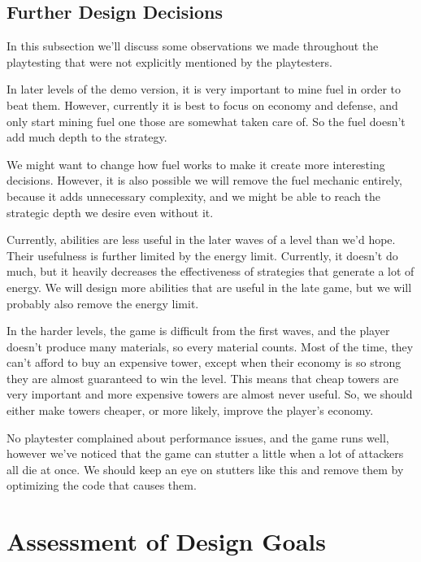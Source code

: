 \subsection{Further Design Decisions}

In this subsection we'll discuss some observations we made throughout the playtesting that were not explicitly mentioned by the playtesters.

In later levels of the demo version, it is very important to mine fuel in order to beat them.
However, currently it is best to focus on economy and defense, and only start mining fuel one those are somewhat taken care of.
So the fuel doesn't add much depth to the strategy.

We might want to change how fuel works to make it create more interesting decisions.
However, it is also possible we will remove the fuel mechanic entirely, because it adds unnecessary complexity, and we might be able to reach the strategic depth we desire even without it.

Currently, abilities are less useful in the later waves of a level than we'd hope.
Their usefulness is further limited by the energy limit.
Currently, it doesn't do much, but it heavily decreases the effectiveness of strategies that generate a lot of energy.
We will design more abilities that are useful in the late game, but we will probably also remove the energy limit.

In the harder levels, the game is difficult from the first waves, and the player doesn't produce many materials, so every material counts.
Most of the time, they can't afford to buy an expensive tower, except when their economy is so strong they are almost guaranteed to win the level.
This means that cheap towers are very important and more expensive towers are almost never useful.
So, we should either make towers cheaper, or more likely, improve the player's economy.

No playtester complained about performance issues, and the game runs well, however we've noticed that the game can stutter a little when a lot of attackers all die at once.
We should keep an eye on stutters like this and remove them by optimizing the code that causes them.

\section{Assessment of Design Goals}

